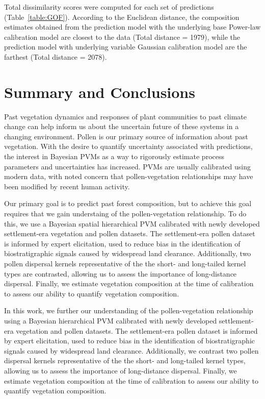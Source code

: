 \documentclass[12pt]{article}
\begin{document}
Total dissimilarity scores were computed for each set of predictions
(Table~\ref{table:GOF}). According to the Euclidean distance, the
composition estimates obtained from the prediction model with the
underlying base Power-law calibration model are closest to the data
(Total distance = 1979), while the prediction model with underlying
variable Gaussian calibration model are the farthest (Total distance =
2078).

\section{Summary and Conclusions}

Past vegetation dynamics and responses of plant communities to past
climate change can help inform us about the uncertain future of these
systems in a changing environment. Pollen is our primary source of
information about past vegetation. With the desire to quantify
uncertainty associated with predictions, the interest in Bayesian PVMs
as a way to rigorously estimate process parameters and uncertainties
has increased. PVMs are usually calibrated using modern data, with
noted concern that pollen-vegetation relationships may have been
modified by recent human activity.

Our primary goal is to predict past forest composition, but to achieve
this goal requires that we gain understaing of the pollen-vegetation
relationship. To do this, we use a Bayesian spatial hierarchical PVM
calibrated with newly developed settlement-era vegetation and pollen
datasets. The settlement-era pollen dataset is informed by expert
elicitation, used to reduce bias in the identification of
biostratigraphic signals caused by widespread land
clearance. Additionally, two pollen dispersal kernels representative
of the the short- and long-tailed kernel types are contrasted,
allowing us to assess the importance of long-distance
dispersal. Finally, we estimate vegetation composition at the time of
calibration to assess our ability to quantify vegetation composition.

In this work, we further our understanding of the pollen-vegetation
relationship using a Bayesian hierarchical PVM calibrated with newly
developed settlement-era vegetation and pollen datasets. The
settlement-era pollen dataset is informed by expert elicitation, used
to reduce bias in the identification of biostratigraphic signals
caused by widespread land clearance. Additionally, we contrast two
pollen dispersal kernels representative of the the short- and
long-tailed kernel types, allowing us to assess the importance of
long-distance dispersal. Finally, we estimate vegetation composition
at the time of calibration to assess our ability to quantify
vegetation composition.
\end{document}

